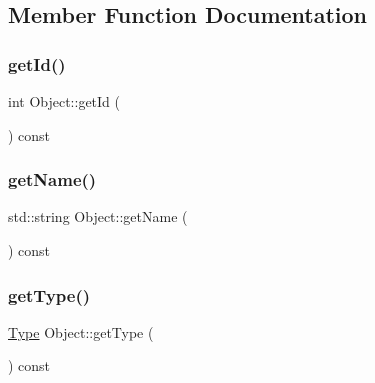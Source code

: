 \subsection{Member Function Documentation}
\mbox{\label{classObject_af3558f9e2b46d677f0ac4d6d3c97b118}} 
\subsubsection{\texorpdfstring{get\+Id()}{getId()}}
{\footnotesize\ttfamily int Object\+::get\+Id (\begin{DoxyParamCaption}{ }\end{DoxyParamCaption}) const\hspace{0.3cm}{\ttfamily [inline]}}

\mbox{\label{classObject_acb9b466607cb80beaaa30ece2f7f570a}} 
\subsubsection{\texorpdfstring{get\+Name()}{getName()}}
{\footnotesize\ttfamily std\+::string Object\+::get\+Name (\begin{DoxyParamCaption}{ }\end{DoxyParamCaption}) const\hspace{0.3cm}{\ttfamily [inline]}}

\mbox{\label{classObject_a9bb97ab8fe1c83ce6dbbb19cba53a578}} 
\subsubsection{\texorpdfstring{get\+Type()}{getType()}}
{\footnotesize\ttfamily \hyperlink{classObject_ad8dadb365053c182931671a424199e36}{Type} Object\+::get\+Type (\begin{DoxyParamCaption}{ }\end{DoxyParamCaption}) const\hspace{0.3cm}{\ttfamily [inline]}}

\mbox{\label{classObject_af7b5e6c789269f331688537c0809fb82}} 
